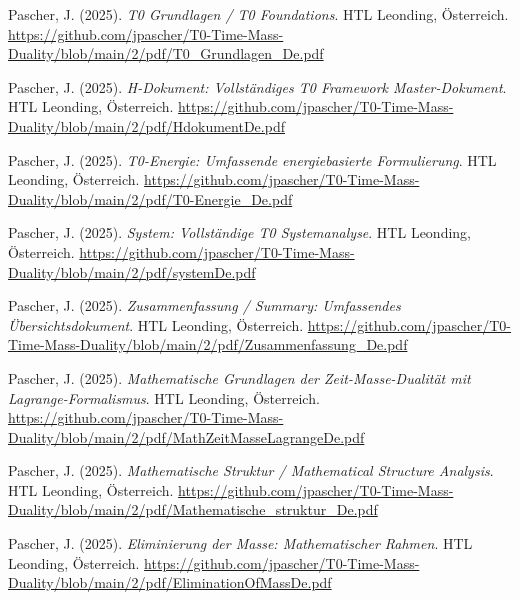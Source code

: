 \documentclass{article}
\begin{document}
	\begin{thebibliography}{99}
		
		
		Pascher, J. (2025).
		\textit{T0 Grundlagen / T0 Foundations}.
		HTL Leonding, Österreich.
		\url{https://github.com/jpascher/T0-Time-Mass-Duality/blob/main/2/pdf/T0_Grundlagen_De.pdf}
		
		Pascher, J. (2025).
		\textit{H-Dokument: Vollständiges T0 Framework Master-Dokument}.
		HTL Leonding, Österreich.
		\url{https://github.com/jpascher/T0-Time-Mass-Duality/blob/main/2/pdf/HdokumentDe.pdf}
		
		Pascher, J. (2025).
		\textit{T0-Energie: Umfassende energiebasierte Formulierung}.
		HTL Leonding, Österreich.
		\url{https://github.com/jpascher/T0-Time-Mass-Duality/blob/main/2/pdf/T0-Energie_De.pdf}
		
		Pascher, J. (2025).
		\textit{System: Vollständige T0 Systemanalyse}.
		HTL Leonding, Österreich.
		\url{https://github.com/jpascher/T0-Time-Mass-Duality/blob/main/2/pdf/systemDe.pdf}
		
		Pascher, J. (2025).
		\textit{Zusammenfassung / Summary: Umfassendes Übersichtsdokument}.
		HTL Leonding, Österreich.
		\url{https://github.com/jpascher/T0-Time-Mass-Duality/blob/main/2/pdf/Zusammenfassung_De.pdf}
		
		
		Pascher, J. (2025).
		\textit{Mathematische Grundlagen der Zeit-Masse-Dualität mit Lagrange-Formalismus}.
		HTL Leonding, Österreich.
		\url{https://github.com/jpascher/T0-Time-Mass-Duality/blob/main/2/pdf/MathZeitMasseLagrangeDe.pdf}
		
		Pascher, J. (2025).
		\textit{Mathematische Struktur / Mathematical Structure Analysis}.
		HTL Leonding, Österreich.
		\url{https://github.com/jpascher/T0-Time-Mass-Duality/blob/main/2/pdf/Mathematische_struktur_De.pdf}
		
		Pascher, J. (2025).
		\textit{Eliminierung der Masse: Mathematischer Rahmen}.
		HTL Leonding, Österreich.
		\url{https://github.com/jpascher/T0-Time-Mass-Duality/blob/main/2/pdf/EliminationOfMassDe.pdf}
		

\end{thebibliography}
\end{document}

